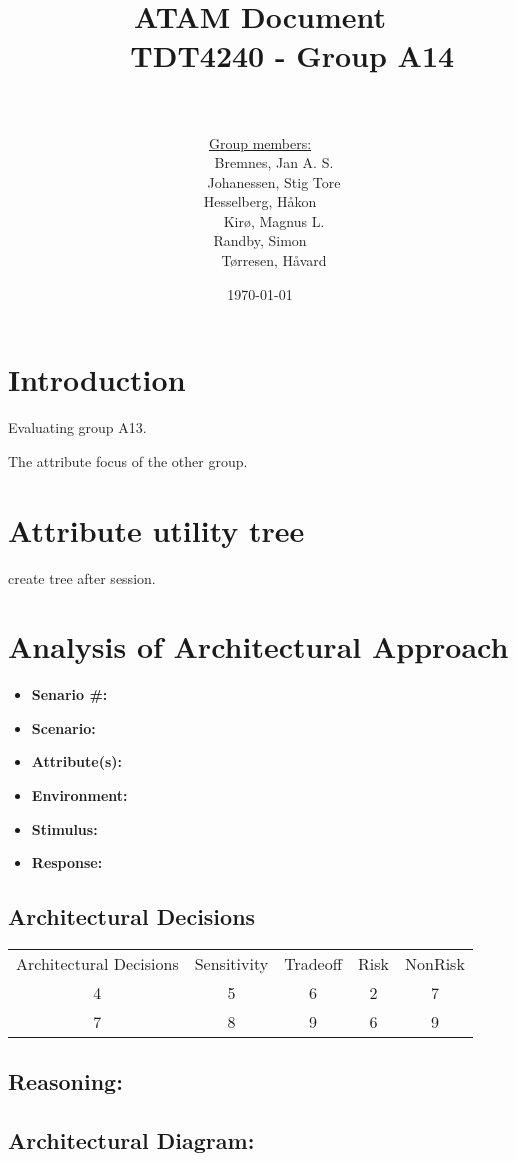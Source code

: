 \documentclass[12pt, a4paper]{article}
\title{
	ATAM Document \\
    TDT4240 - Group A14 \\
	\\
	}
\author{
	\underline{Group members:} \\
    Bremnes, Jan A. S.\\
    Johanessen, Stig Tore\\
	Hesselberg, Håkon \\
    Kirø, Magnus L.\\
	Randby, Simon \\
    Tørresen, Håvard\\
}
\date{\today}
\begin{document}
\maketitle
{}

\tableofcontents

\section{Introduction}
Evaluating group A13. 

The attribute focus of the other group. 

\section{Attribute utility tree}
create tree after session. 

\section{Analysis of Architectural Approach}
\begin{itemize}
	\item \textbf{Senario \#:}  
	\item \textbf{Scenario:} 
	\item \textbf{Attribute(s):}  
	\item \textbf{Environment:}
	\item \textbf{Stimulus:}
	\item \textbf{Response:}
\end{itemize}

\subsection{Architectural Decisions}

\begin{tabular}{ c c c c c }
  Architectural Decisions & Sensitivity & Tradeoff & Risk & NonRisk \\
  4 & 5 & 6 & 2 & 7 \\
  7 & 8 & 9 & 6 & 9 \\
\end{tabular}

\subsection{Reasoning:}

\subsection{Architectural Diagram:}
\end{document}
